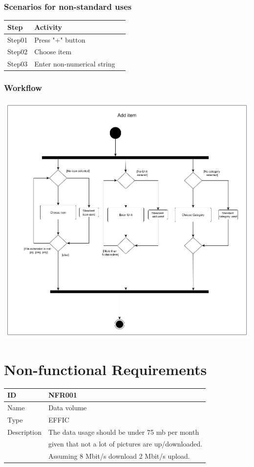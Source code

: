 \documentclass[12pt]{article}
\theoremstyle{definition}
\begin{document}
\subsubsection{Scenarios for non-standard uses}

\begin{tabular}{|l|l|l|}
\hline
Step & Activity \\ \hline
Step01 & Press "+" button \\ \hline
Step02 & Choose item \\ \hline
Step03 & Enter non-numerical string \\ \hline
\end{tabular}

\subsubsection{Workflow}

\includegraphics[scale=.5]{Images/ActivityAddItem.png}

\pagebreak

\section{Non-functional Requirements}

\begin{flushleft}
  \begin{tabular}{|l|L{10cm}|}
  \hline
  ID & NFR001\\ \hline
  Name & Data volume \\ \hline
  Type &  EFFIC\\ \hline
  Description & The data usage should be under 75 mb per month \\
  & given that not a lot of pictures are up/downloaded. \\
  & Assuming 8 Mbit/s download 2 Mbit/s upload. \\ \hline
  \end{tabular}
\end{flushleft}
\end{document}
